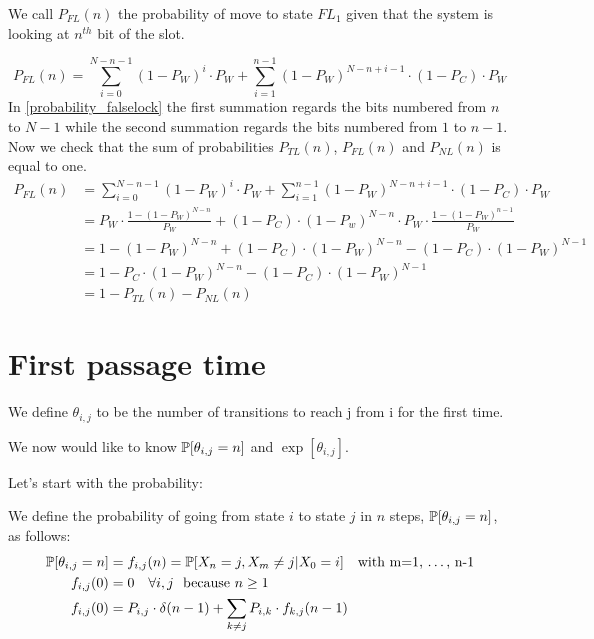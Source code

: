 We call $P_{FL}(n)$ the probability of move to state $FL_1$ given that the system is looking at $n^{th}$ bit of the slot.

\begin{equation}
	P_{FL}(n) = \sum_{i=0}^{N-n-1} (1-P_W)^{i} \cdot P_W + \sum_{i=1}^{n-1} (1-P_W)^{N-n+i-1} \cdot (1-P_C) \cdot P_W
	\label{probability_falselock}
\end{equation}
In \eqref{probability_falselock} the first summation regards the bits numbered from $n$ to $N-1$ while the second summation regards the bits numbered from $1$ to $n-1$.
Now we check that the sum of probabilities $P_{TL}(n)$, $P_{FL}(n)$ and $P_{NL}(n)$ is equal to one.
\begin{equation}
	\begin{split}
		P_{FL}(n) & = \sum_{i=0}^{N-n-1} (1-P_W)^{i} \cdot P_W + \sum_{i=1}^{n-1} (1-P_W)^{N-n+i-1} \cdot (1-P_C) \cdot P_W \\
		& = P_W \cdot \frac{1-(1-P_W)^{N-n}}{P_W} + (1-P_C) \cdot (1-P_w)^{N-n} \cdot P_W \cdot \frac{1-(1-P_W)^{n-1}}{P_W} \\
		& = 1 - (1-P_W)^{N-n} + (1-P_C) \cdot (1-P_W)^{N-n} - (1-P_C) \cdot (1-P_W)^{N-1} \\
		& = 1 - P_C \cdot (1-P_W)^{N-n} - (1-P_C) \cdot (1-P_W)^{N-1} \\
		& = 1 - P_{TL}(n) - P_{NL}(n)
	\end{split}
\end{equation}

\section{First passage time}
\begin{definition}[$\theta_{i,j}$]
We define $\theta_{i,j}$ to be the number of transitions to reach j from i for the first time.
\end{definition}
We now would like to know $\mathbb{P}[\theta_{i,j}=n]$ and $\exp[\theta_{i,j}]$.

Let's start with the probability:
\begin{definition}
	We define the probability of going from state $i$ to state $j$ in $n$ steps, $\mathbb{P}[\theta_{i,j}=n]$, as follows:
	\begin{equation}\begin{split}
		\mathbb{P}[\theta_{i,j}=n] &= f_{i,j}(n)=\mathbb{P}[X_n=j,X_m \neq j | X_0 = i] \quad \text{with m=1, \dots , n-1}\\
		f_{i,j}(0)&=0 \quad \forall i,j \,\, \text{ because $n \ge 1$}\\
		f_{i,j}(0)&=P_{i,j} \cdot \delta(n-1) + \sum\limits_{k \neq j} P_{i,k} \cdot f_{k,j}(n-1)\\
	\end{split}\end{equation}
\end{definition}
